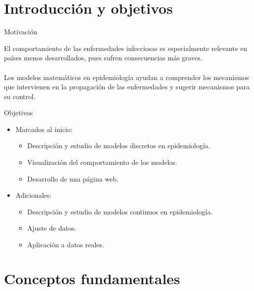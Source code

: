 \section{Introducción y objetivos}


\begin{frame}[c]{Motivación}

    El comportamiento de las enfermedades infecciosas es especialmente relevante en países menos desarrollados, pues sufren consecuencias más graves.
    \\~\\
    Los modelos matemáticos en epidemiología ayudan a comprender los mecanismos que intervienen en la propagación de las enfermedades y sugerir mecanismos para su control.

\end{frame}


\begin{frame}{Objetivos}

    \begin{itemize}
        \item Marcados al inicio:

        \pause
        \begin{itemize}
            \item Descripción y estudio de modelos discretos en epidemiología.
            \pause
            \item Visualización del comportamiento de los modelos.
            \pause
            \item Desarrollo de una página web.
        \end{itemize}
        
        \pause
        \item Adicionales:

        \pause
        \begin{itemize}
            \item Descripción y estudio de modelos continuos en epidemiología.
            \pause
            \item Ajuste de datos.
            \pause
            \item Aplicación a datos reales.
        \end{itemize}
    \end{itemize}

\end{frame}




\section{Conceptos fundamentales}


